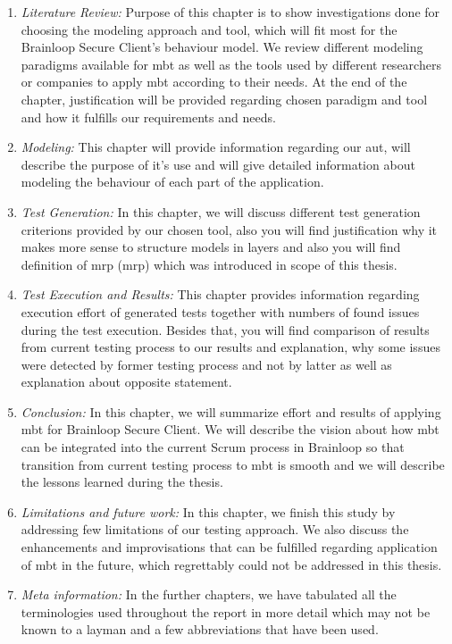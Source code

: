 \begin{enumerate}

\item \textit{Literature Review: }
Purpose of this chapter is to show investigations done for choosing the modeling approach and tool, which will fit most for the Brainloop Secure Client’s behaviour model. We review different modeling paradigms available for \acrlong{mbt} as well as the tools used by different researchers or companies to apply \acrlong{mbt} according to their needs. At the end of the chapter, justification will be provided regarding chosen paradigm and tool and how it fulfills our requirements and needs.

\item \textit{Modeling: } This chapter will provide information regarding our \acrlong{aut}, will describe the purpose of it's use and will give detailed information about modeling the behaviour of each part of the application.

\item \textit{Test Generation: } In this chapter, we will discuss different test generation criterions provided by our chosen tool, also you will find justification why it makes more sense to structure models in layers and also you will find definition of \acrshort{mrp} (\acrlong{mrp}) which was introduced in scope of this thesis.

\item \textit{Test Execution and Results: } This chapter provides information regarding execution effort of generated tests together with numbers of found issues during the test execution. Besides that, you will find comparison of results from current testing process to our results and explanation, why some issues were detected by former testing process and not by latter as well as explanation about opposite statement.

\item \textit{Conclusion:  }In this chapter, we will summarize effort and results of applying \acrlong{mbt} for Brainloop Secure Client. We will describe the vision about how \acrlong{mbt} can be integrated into the current Scrum process in Brainloop so that transition from current testing process to \acrlong{mbt} is smooth and we will describe the lessons learned during the thesis.

\item \textit{Limitations and future work: } In this chapter, we finish this study by addressing few limitations of our testing approach. We also discuss the enhancements and improvisations that can be fulfilled regarding application of \acrlong{mbt} in the future, which regrettably could not be addressed in this thesis.

\item \textit{Meta information: }In the further chapters, we have tabulated all the terminologies used throughout the report in more detail which may not be known to a layman and a few abbreviations that have been used.
    
\end{enumerate}

